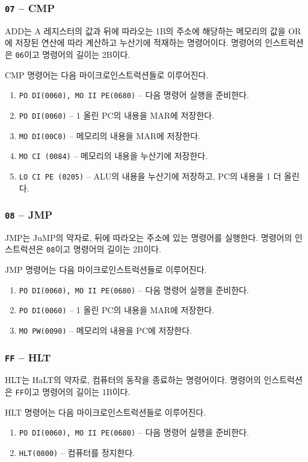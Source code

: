 \documentclass{article}
\begin{document}
\subsubsection{\texttt{07} -- CMP}

ADD는 A 레지스터의 값과 뒤에 따라오는 1B의 주소에 해당하는 메모리의 값을
OR에 저장된 연산에 따라 계산하고 누산기에 적재하는 명령어이다.
명령어의 인스트럭션은 \texttt{06}이고 명령어의 길이는 2B이다.

CMP 명령어는 다음 마이크로인스트럭션들로 이루어진다.

\begin{enumerate}
    \item \texttt{PO DI(0060), MO II PE(0680)} -- 다음 명령어 실행을 준비한다.
    \setcounter{enumi}{2}
    \item \texttt{PO DI(0060)} -- 1 올린 PC의 내용을 MAR에 저장한다.
    \item \texttt{MO DI(00C0)} -- 메모리의 내용을 MAR에 저장한다.
    \item \texttt{MO CI (0084)} -- 메모리의 내용을 누산기에 저장한다.
    \item \texttt{LO CI PE (0205)} -- ALU의 내용을 누산기에 저장하고,
        PC의 내용을 1 더 올린다.
\end{enumerate}

\subsubsection{\texttt{08} -- JMP}

JMP는 JuMP의 약자로, 뒤에 따라오는 주소에 있는 명령어를 실행한다.
명령어의 인스트럭션은 \texttt{08}이고 명령어의 길이는 2B이다.

JMP 명령어는 다음 마이크로인스트럭션들로 이루어진다.

\begin{enumerate}
    \item \texttt{PO DI(0060), MO II PE(0680)} -- 다음 명령어 실행을 준비한다.
    \setcounter{enumi}{2}
    \item \texttt{PO DI(0060)} -- 1 올린 PC의 내용을 MAR에 저장한다.
    \item \texttt{MO PW(0090)} -- 메모리의 내용을 PC에 저장한다.
\end{enumerate}

\subsubsection{\texttt{FF} -- HLT}

HLT는 HaLT의 약자로, 컴퓨터의 동작을 종료하는 명령어이다.
명령어의 인스트럭션은 \texttt{FF}이고 명령어의 길이는 1B이다.

HLT 명령어는 다음 마이크로인스트럭션들로 이루어진다.

\begin{enumerate}
    \item \texttt{PO DI(0060), MO II PE(0680)} -- 다음 명령어 실행을 준비한다.
    \setcounter{enumi}{2}
    \item \texttt{HLT(0800)} -- 컴퓨터를 정지한다.
\end{enumerate}
\end{document}
